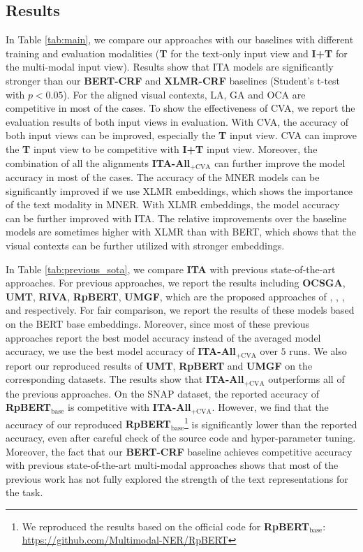 \documentclass[11pt]{article}
\begin{document}
\subsection{Results}
In Table \ref{tab:main}, we compare our approaches with our baselines with different training and evaluation modalities (\textbf{T} for the text-only input view and \textbf{I+T} for the multi-modal input view). Results show that ITA models are significantly stronger than our {\textbf{BERT-CRF}} and {\textbf{XLMR-CRF}} baselines (Student's t-test with $p<0.05$). For the aligned visual contexts, LA, GA and OCA are competitive in most of the cases. To show the effectiveness of CVA, we report the evaluation results of both input views in evaluation. With CVA, the accuracy of both input views can be improved, especially the \textbf{T} input view. CVA can improve the \textbf{T} input view to be competitive with \textbf{I+T} input view. Moreover, the combination of all the alignments \textbf{ITA-All$_{\text{+CVA}}$} can further improve the model accuracy in most of the cases. The accuracy of the MNER models can be significantly improved if we use XLMR embeddings, which shows the importance of the text modality in MNER. With XLMR embeddings, the model accuracy can be further improved with ITA. The relative improvements over the baseline models are sometimes higher with XLMR than with BERT, which shows that the visual contexts can be further utilized with stronger embeddings. 

In Table \ref{tab:previous_sota}, we compare \textbf{ITA} with previous state-of-the-art approaches. For previous approaches, we report the results including
\textbf{OCSGA}, \textbf{UMT}, \textbf{RIVA}, \textbf{RpBERT}, \textbf{UMGF}, which are the proposed approaches of \citet{10.1145/3394171.3413650}, \citet{yu-etal-2020-improving-multimodal}, \citet{sun-etal-2020-riva}, \citet{Sun2021RpBERTAT} and \citet{zhang2021multi} respectively. For fair comparison, we report the results of these models based on the BERT base embeddings. Moreover, since most of these previous approaches report the best model accuracy instead of the averaged model accuracy, we use the best model accuracy of \textbf{ITA-All$_{\text{+CVA}}$} over $5$ runs. We also report our reproduced results of \textbf{UMT}, {\textbf{RpBERT}} and \textbf{UMGF} on the corresponding datasets. The results show that \textbf{ITA-All$_{\text{+CVA}}$} outperforms all of the previous approaches. On the SNAP dataset, the reported accuracy of {\textbf{RpBERT$_{\text{base}}$}} is competitive with \textbf{ITA-All$_{\text{+CVA}}$}. However, we find that the accuracy of our reproduced {\textbf{RpBERT$_{\text{base}}$}}\footnote{We reproduced the results based on the official code for {\textbf{RpBERT$_{\text{base}}$}}: \url{https://github.com/Multimodal-NER/RpBERT}} is significantly lower than the reported accuracy, even after careful check of the source code and hyper-parameter tuning.
Moreover, the fact that our \textbf{BERT-CRF} baseline achieves competitive accuracy with previous state-of-the-art multi-modal approaches shows that most of the previous work has not fully explored the strength of the text representations for the task. 
\end{document}

